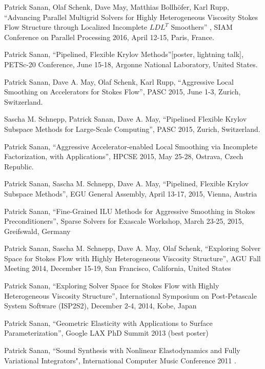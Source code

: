 \documentclass[a4paper,11pt]{article}
\begin{document}
\begin{innerlist}
\item Patrick Sanan, Olaf Schenk, Dave May, Matthias Bollh\"{o}fer, Karl Rupp, ``Advancing Parallel Multigrid Solvers for Highly Heterogeneous Viscosity Stokes Flow Structure through Localized Incomplete $LDL^T$ Smoothers'' , SIAM Conference on Parallel Processing 2016, April 12-15, Paris, France.
\item Patrick Sanan, ``Pipelined, Flexible Krylov Methods''[poster, lightning talk], PETSc-20 Conference, June 15-18, Argonne National Laboratory, United States.
\item Patrick Sanan, Dave A. May, Olaf Schenk, Karl Rupp, ``Aggressive Local Smoothing on Accelerators for Stokes Flow'', PASC 2015, June 1-3, Zurich, Switzerland.
\item Sascha M. Schnepp, Patrick Sanan, Dave A. May, ``Pipelined Flexible Krylov Subspace Methods for Large-Scale Computing'', PASC 2015, Zurich, Switzerland.
\item Patrick Sanan, ``Aggressive Accelerator-enabled Local Smoothing via Incomplete Factorization, with Applications'', HPCSE 2015, May 25-28, Ostrava, Czech Republic.
\item Patrick Sanan, Sascha M. Schnepp, Dave A. May, ``Pipelined, Flexible Krylov Subspace Methods'', EGU General Assembly, April 13-17, 2015, Vienna, Austria
\item Patrick Sanan, ``Fine-Grained ILU Methods for Aggressive Smoothing in Stokes Preconditioners'', Sparse Solvers for Exascale Workshop, March 23-25, 2015, Greifswald, Germany
\item Patrick Sanan, Sascha M. Schnepp, Dave A. May, Olaf Schenk, ``Exploring Solver Space for Stokes Flow with Highly Heterogeneous Viscosity Structure'', AGU Fall Meeting 2014, December 15-19, San Francisco, California, United States
\item Patrick Sanan, ``Exploring Solver Space for Stokes Flow with Highly Heterogeneous Viscosity Structure'', International Symposium on Post-Petascale System Software (ISP2S2), December 2-4, 2014, Kobe, Japan
\item Patrick Sanan, ``Geometric Elasticity with Applications to Surface Parameterization'', Google LAX PhD Summit 2013 (best poster)
\item Patrick Sanan, ``Sound Synthesis with Nonlinear Elastodynamics and Fully Variational Integrators", International Computer Music Conference 2011 .
\end{innerlist}
\end{document}
